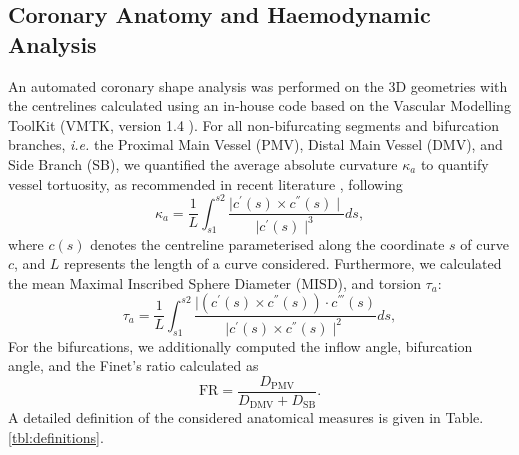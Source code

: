 \documentclass[preprint,11pt,review]{elsarticle}
\begin{document}
\subsection{Coronary Anatomy and Haemodynamic Analysis}
An automated coronary shape analysis was performed on the 3D geometries with the centrelines calculated using an in-house code based on the Vascular Modelling ToolKit (VMTK, version 1.4 \cite{Antiga2012VMTK:}). For all non-bifurcating segments and bifurcation branches, \textit{i.e.} the Proximal Main Vessel (PMV), Distal Main Vessel (DMV), and Side Branch (SB), we quantified the average absolute curvature $\kappa_a$ to quantify vessel tortuosity, as recommended in recent literature \cite{Kashyap2022Accuracy}, following 
\begin{equation}
    \kappa_a = \frac{1}{L}\int_{s1}^{s2}\frac{\mid c^{'}(s)\times c^{''}(s)\mid} {\mid c^{'}(s)\mid ^3} ds,
\end{equation}
where $c(s)$ denotes the centreline parameterised along the coordinate $s$ of curve $c$, and $L$ represents the length of a curve considered. Furthermore, we calculated the mean Maximal Inscribed Sphere Diameter (MISD), and torsion $\tau_a$:
\begin{equation}
    \tau_a = \frac{1}{L}\int_{s1}^{s2}\frac{\mid (c^{'}(s) \times c^{''}(s))\cdot c^{'''}(s) }{\mid c^{'}(s) \times c^{''}(s)\mid ^2} ds,
\end{equation}
For the bifurcations, we additionally computed the inflow angle, bifurcation angle, and the Finet’s ratio \cite{Medrano-Gracia2016computational} calculated as
\begin{equation}
    \text{FR} = \frac{D_{\text{PMV}}}{D_{\text{DMV}} + D_{\text{SB}}}.
\end{equation}
A detailed definition of the considered anatomical measures is given in Table. \ref{tbl:definitions}. 
\end{document}
